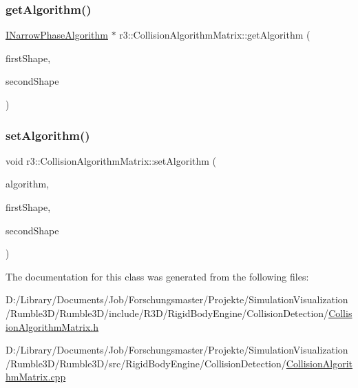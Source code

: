 \subsubsection{\texorpdfstring{get\+Algorithm()}{getAlgorithm()}}
{\footnotesize\ttfamily \mbox{\hyperlink{classr3_1_1_i_narrow_phase_algorithm}{I\+Narrow\+Phase\+Algorithm}} $\ast$ r3\+::\+Collision\+Algorithm\+Matrix\+::get\+Algorithm (\begin{DoxyParamCaption}\item[{\mbox{\hyperlink{namespacer3_a7079ec5e42c1a55140d3bc093d49e319}{Collision\+Primitive\+Type}}}]{first\+Shape,  }\item[{\mbox{\hyperlink{namespacer3_a7079ec5e42c1a55140d3bc093d49e319}{Collision\+Primitive\+Type}}}]{second\+Shape }\end{DoxyParamCaption})}

\mbox{\label{classr3_1_1_collision_algorithm_matrix_a6ddf117fbce8a3216b4b4413ccade6d0}} 
\subsubsection{\texorpdfstring{set\+Algorithm()}{setAlgorithm()}}
{\footnotesize\ttfamily void r3\+::\+Collision\+Algorithm\+Matrix\+::set\+Algorithm (\begin{DoxyParamCaption}\item[{\mbox{\hyperlink{classr3_1_1_i_narrow_phase_algorithm}{I\+Narrow\+Phase\+Algorithm}} $\ast$}]{algorithm,  }\item[{\mbox{\hyperlink{namespacer3_a7079ec5e42c1a55140d3bc093d49e319}{Collision\+Primitive\+Type}}}]{first\+Shape,  }\item[{\mbox{\hyperlink{namespacer3_a7079ec5e42c1a55140d3bc093d49e319}{Collision\+Primitive\+Type}}}]{second\+Shape }\end{DoxyParamCaption})}



The documentation for this class was generated from the following files\+:\begin{DoxyCompactItemize}
\item 
D\+:/\+Library/\+Documents/\+Job/\+Forschungsmaster/\+Projekte/\+Simulation\+Visualization/\+Rumble3\+D/\+Rumble3\+D/include/\+R3\+D/\+Rigid\+Body\+Engine/\+Collision\+Detection/\mbox{\hyperlink{_collision_algorithm_matrix_8h}{Collision\+Algorithm\+Matrix.\+h}}\item 
D\+:/\+Library/\+Documents/\+Job/\+Forschungsmaster/\+Projekte/\+Simulation\+Visualization/\+Rumble3\+D/\+Rumble3\+D/src/\+Rigid\+Body\+Engine/\+Collision\+Detection/\mbox{\hyperlink{_collision_algorithm_matrix_8cpp}{Collision\+Algorithm\+Matrix.\+cpp}}\end{DoxyCompactItemize}
